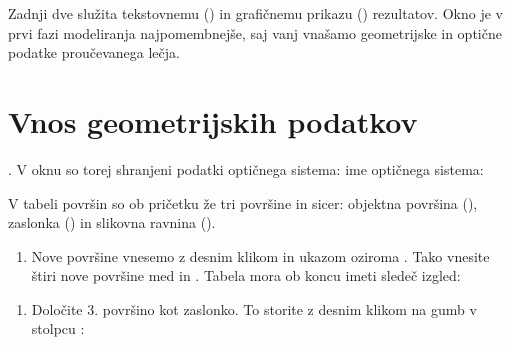 \documentclass[letterpaper,10pt,english]{sphinxmanual}
\begin{document}
\begin{figure}[htbp]
\centering

\noindent{}
\end{figure}

\sphinxAtStartPar
Zadnji dve služita tekstovnemu () in grafičnemu prikazu () rezultatov. Okno  je v prvi fazi modeliranja najpomembnejše, saj vanj vnašamo geometrijske
in optične podatke proučevanega lečja.


\section{Vnos geometrijskih podatkov}
\label{\detokenize{oslo:vnos-geometrijskih-podatkov}}
. V oknu  so torej shranjeni podatki optičnega sistema:
ime optičnega sistema:

\begin{figure}[htbp]
\centering

\noindent{}
\end{figure}

\sphinxAtStartPar
V tabeli površin so ob pričetku že tri površine in sicer: objektna površina (), zaslonka () in slikovna ravnina ().
\begin{enumerate}
%
\setcounter{enumi}{1}
\item {} 
\sphinxAtStartPar
Nove površine vnesemo z desnim klikom in ukazom  oziroma . Tako vnesite štiri nove površine med  in . Tabela mora ob koncu imeti sledeč izgled:

\end{enumerate}

\begin{figure}[htbp]
\centering

\noindent{}
\end{figure}
\begin{enumerate}
%
\setcounter{enumi}{2}
\item {} 
\sphinxAtStartPar
Določite 3. površino kot zaslonko. To storite z desnim klikom na gumb v stolpcu :

\end{enumerate}
\end{document}

